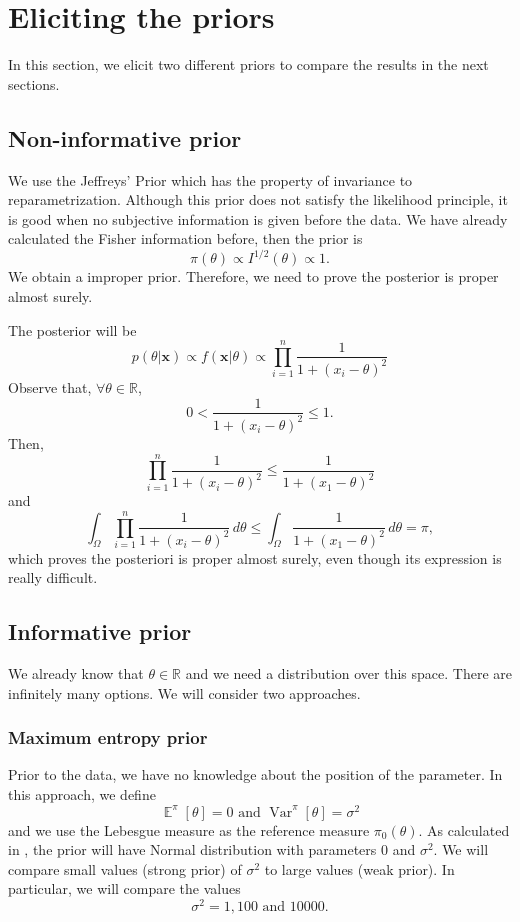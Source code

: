 \documentclass[a4paper,10pt, notitlepage]{report}
\theoremstyle{plain}
\newcommand{\var}{\operatorname{Var}} %
\newcommand{\ev}{\operatorname{\mathbb{E}}}
\newcommand{\bx}{\boldsymbol{x}} %
\newcommand{\R}{\mathbb{R}}
\begin{document}
\section*{Eliciting the priors}
\label{sec:priors}

In this section, we elicit two different priors to compare the results in the
next sections. 

\subsection*{Non-informative prior}

We use the Jeffreys' Prior which has the property of invariance to
reparametrization. Although this prior does not satisfy the likelihood
principle, it is good when no subjective information is given before the data.
We have already calculated the Fisher information before, then the prior is 
\begin{equation}
    \label{eq:jeffreys-prior}
    \pi(\theta) \propto I^{1/2}(\theta) \propto 1.
\end{equation}
We obtain a improper prior. Therefore, we need to prove the posterior is
proper almost surely.

The posterior will be 
$$
p(\theta|\bx) \propto f(\bx|\theta) \propto \prod_{i=1}^n \frac{1}{1 + (x_i - \theta)^2}
$$
Observe that, $\forall \theta \in \R$,
$$
0 < \frac{1}{1 + (x_i - \theta)^2} \le 1.
$$
Then, 
$$
\prod_{i=1}^n \frac{1}{1 + (x_i - \theta)^2} \le \frac{1}{1 + (x_1 - \theta)^2}
$$
and
$$
\int_{\Omega} \prod_{i=1}^n \frac{1}{1 + (x_i - \theta)^2} \, d\theta \le \int_{\Omega} \frac{1}{1 + (x_1 - \theta)^2} \, d\theta = \pi,
$$
which proves the posteriori is proper almost surely, even though its expression
is really difficult. 

\subsection*{Informative prior}

We already know that $\theta \in \R$ and we need a distribution over this space.
There are infinitely many options. We will consider two approaches. 

\subsubsection*{Maximum entropy prior}

Prior to the data, we have no knowledge about the position of the parameter.
In this approach, we define 
$$
\ev^{\pi}[\theta] = 0 \text{ and } \var^{\pi}[\theta] = \sigma^2
$$
and we use the Lebesgue measure as the reference measure $\pi_0(\theta)$. As
calculated in \cite[Example 3.2.4]{Robert2007}, the prior will have Normal
distribution with parameters $0$ and $\sigma^2$. We will compare small values
(strong prior) of $\sigma^2$ to large values (weak prior). In particular, we
will compare the values 
$$\sigma^2 = 1, 100 \text{ and }  10000.$$
\end{document}
